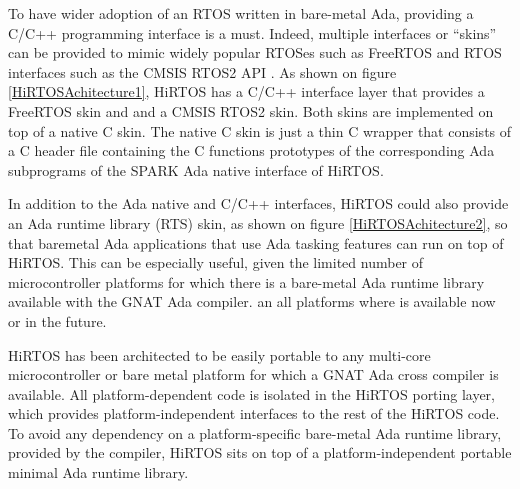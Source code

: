 \documentclass[11pt,letterpaper,twoside,openany]{book}
\begin{document}
To have wider adoption of an RTOS written in bare-metal Ada, providing a C/C++ programming interface
is a must. Indeed, multiple interfaces or ``skins'' can be provided to mimic widely popular
RTOSes such as FreeRTOS \cite{freeRTOS} and RTOS interfaces such as the CMSIS RTOS2 API \cite{cmsisRTOS}.
As shown on figure \ref{HiRTOSAchitecture1}, HiRTOS has a C/C++ interface layer that provides
a FreeRTOS skin and and a CMSIS RTOS2 skin. Both skins are implemented on top of a native C skin.
The native C skin is just a thin C wrapper that consists of a C header file containing the C
functions prototypes of the corresponding Ada subprograms of the SPARK Ada native interface of HiRTOS.

In addition to the Ada native and  C/C++ interfaces, HiRTOS could also provide an Ada runtime library (RTS) skin,
as shown on figure \ref{HiRTOSAchitecture2}, so that baremetal Ada applications that use Ada tasking
features can run on top of HiRTOS. This can be especially useful, given the limited number of
microcontroller platforms for which there is a bare-metal Ada runtime library available with the
GNAT Ada compiler. an all platforms where is available now or in the future.

HiRTOS has been architected to be easily portable to any multi-core microcontroller or bare metal
platform for which a GNAT Ada cross compiler is available. All platform-dependent code is isolated in the
HiRTOS porting layer, which provides platform-independent interfaces to the rest of the HiRTOS code.
To avoid any dependency on a platform-specific bare-metal Ada runtime library, provided by the
compiler, HiRTOS sits on top of a platform-independent portable minimal Ada runtime library.
\end{document}
